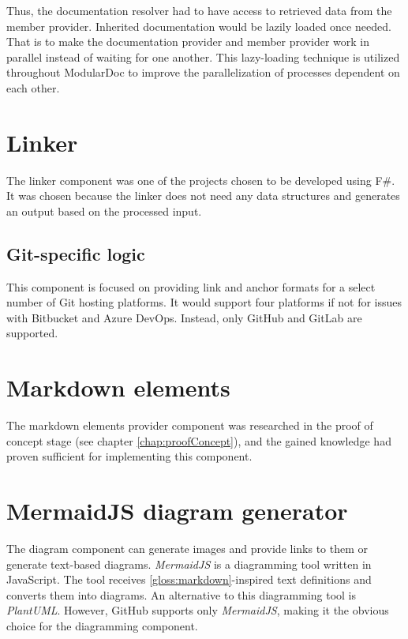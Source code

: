 Thus, the documentation resolver had to have access to retrieved data from the member provider. Inherited documentation would be lazily loaded once needed. That is to make the documentation provider and member provider work in parallel instead of waiting for one another. This lazy-loading technique is utilized throughout ModularDoc to improve the parallelization of processes dependent on each other.

\section{Linker} \label{sec:linker}

The linker component was one of the projects chosen to be developed using F\#. It was chosen because the linker does not need any data structures and generates an output based on the processed input.

\subsection{Git-specific logic}

This component is focused on providing link and anchor formats for a select number of Git hosting platforms. It would support four platforms if not for issues with Bitbucket and Azure DevOps. Instead, only GitHub and GitLab are supported.

\section{Markdown elements}

The markdown elements provider component was researched in the proof of concept stage (see chapter \ref{chap:proofConcept}), and the gained knowledge had proven sufficient for implementing this component.

\section{MermaidJS diagram generator}

The diagram component can generate images and provide links to them or generate text-based diagrams. \textit{MermaidJS} is a diagramming tool written in JavaScript. The tool receives \ref{gloss:markdown}-inspired text definitions and converts them into diagrams. An alternative to this diagramming tool is \textit{PlantUML}. However, GitHub supports only \textit{MermaidJS}, making it the obvious choice for the diagramming component.

